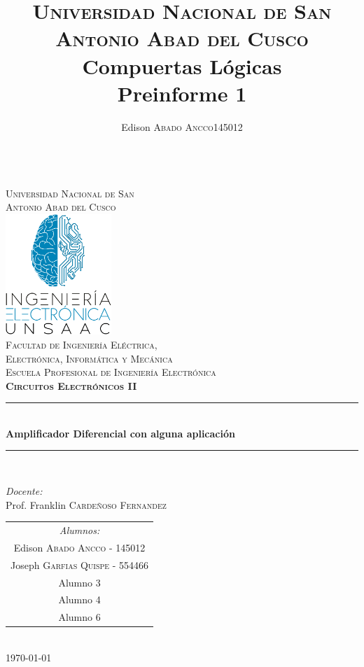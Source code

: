\documentclass[a4paper]{article} %
\title{
	\textsc{Universidad Nacional de San Antonio Abad del Cusco}\\
	\textbf{Compuertas Lógicas}\\
	Preinforme 1}
\author{
	\begin{tabular}{lr}
		Edison \textsc{Abado Ancco} & 145012 \\
	\end{tabular}
}
\begin{document}
	\begin{titlepage}
		\newcommand{\HRule}{\rule{\linewidth}{0.5mm}} 
		\center
		\textsc{\LARGE \vspace{1.1cm} \\ Universidad Nacional de San \\[0.2cm] Antonio Abad del Cusco}\\[1.2cm] 
		\includegraphics[width=4cm]{IMAGENES/logoLiC}\\[1cm]
		\textsc{\Large Facultad de Ingeniería Eléctrica, \\ Electrónica, Informática y Mecánica}\\[0.5cm] 
		\textsc{\large Escuela Profesional de Ingeniería Electrónica}\\[0.5cm]
		\textsc{\Large \textbf{Circuitos Electrónicos II}}\\[0.5cm] 
		\HRule \\[0.4cm]
		{ \huge \bfseries Amplificador Diferencial con alguna aplicación}\\[0.30cm] 
		\HRule \\[1.4cm]
		\begin{minipage}{\textwidth}
			\center 
			
			\emph{Docente:} \\
			Prof. Franklin  \textsc{Cardeñoso Fernandez} \\[1cm]
			
			\begin{tabular}{c}
				\emph{Alumnos:}  \\
				Edison   \textsc{Abado Ancco} - 145012 \\
				Joseph \textsc{Garfias Quispe} - 554466 \\
				Alumno 3 \\
				Alumno 4 \\
				Alumno 6
			\end{tabular}
		\end{minipage}\\[2cm]
		\today
	\end{titlepage}
	
\end{document}
